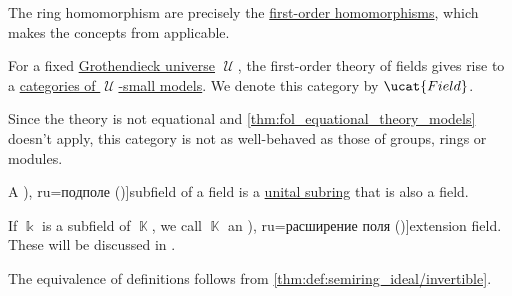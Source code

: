 \begin{definition}
\begin{thmenum}
    The ring homomorphism are precisely the \hyperref[def:fol_homomorphism]{first-order homomorphisms}, which makes the concepts from  applicable.

    \mimprovised For a fixed \hyperref[def:grothendieck_universe]{Grothendieck universe} \( \mscrU \), the first-order theory of fields gives rise to a \hyperref[def:fol_theory_model_functor/obj]{categories of \( \mscrU \)-small models}. We denote this category by \( \ucat{Field} \).

    Since the theory is not equational and \cref{thm:fol_equational_theory_models} doesn't apply, this category is not as well-behaved as those of groups, rings or modules.

     A \term[bg=подполе (\cite[192]{ГеновМиховскиМоллов1991Алгебра}), ru=подполе (\cite[153]{Тыртышников2017ОсновыАлгебры})]{subfield} of a field is a \hyperref[def:ring/subobject]{unital subring} that is also a field.

    If \( \Bbbk \) is a subfield of \( \BbbK \), we call \( \BbbK \) an \term[bg=разширение на поле (\cite[194]{ГеновМиховскиМоллов1991Алгебра}), ru=расширение поля (\cite[160]{Кострикин2020АлгебраЧасть1})]{extension field}. These will be discussed in .
  \end{thmenum}
\end{definition}
\begin{defproof}
  The equivalence of definitions follows from \cref{thm:def:semiring_ideal/invertible}.
\end{defproof}
